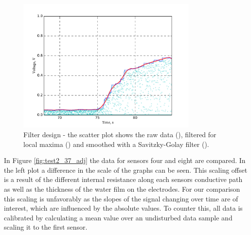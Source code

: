 \begin{figure}[H]
	\begin{center}
		\includegraphics[width=0.8\textwidth]{images/log080716_2_7_scatter.pdf} 
		\caption{Filter design - the scatter plot shows the raw data (\drawline[cyan]), filtered for local maxima (\drawline[blue]) and smoothed with a Savitzky-Golay filter (\drawline[red]).}
		\label{fig:test2_7_scatter}
	\end{center}
\end{figure}

In Figure \ref{fig:test2_37_adj} the data for sensors four and eight are compared. In the left plot a difference in the scale of the graphs can be seen. This scaling offset is a result of the different internal resistance along each sensors conductive path as well as the thickness of the water film on the electrodes. For our comparison this scaling is unfavorably as the slopes of the signal changing over time are of interest, which are influenced by the absolute values. To counter this, all data is calibrated by calculating a mean value over an undisturbed data sample and scaling it to the first sensor.

